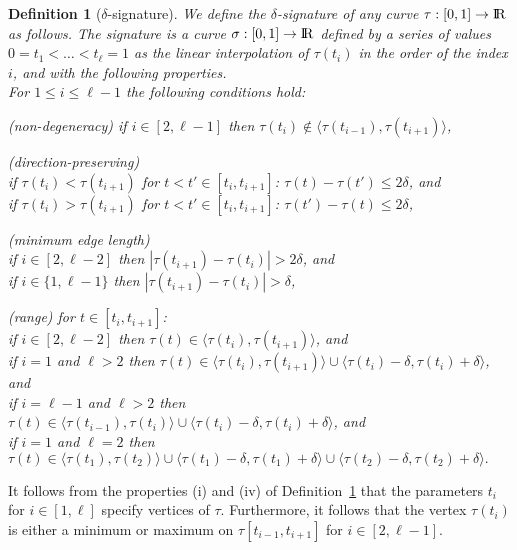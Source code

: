 \documentclass[11pt, letter]{article}
\newtheorem{definition}[theorem]{Definition}
\newcommand{\deflab}[1]{\label{def:#1}}
\newcommand{\defref}[1]{Definition~\ref{def:#1}}
\renewcommand{\Re}{{\rm I\!\hspace{-0.025em} R}}
\newcommand{\lenClusters}{\ensuremath{\ell}}
\begin{document}
\begin{definition}[$\delta$-signature]\deflab{signature}
We define the $\delta$-signature of any 
curve $\tau: [0,1]\rightarrow
\Re$ as follows.
The signature is a curve $\sigma: [0,1] \rightarrow \Re$ defined by a series of values $0=t_1 <\dots<t_\lenClusters=1$ as the linear interpolation of $\tau(t_i)$ in the order of the index $i$, and with the following properties.\\ 
For $1 \leq i \leq \lenClusters -1$ the following conditions hold: 
\begin{compactenum}[(i)]
\item (non-degeneracy) if $i \in [2,\lenClusters-1]$ then $\tau(t_i) \notin \langle \tau(t_{i-1}), \tau(t_{i+1})\rangle $,
\item (direction-preserving)\\if $\tau(t_i)<\tau(t_{i+1})$ for $t < t' \in [t_i,t_{i+1}]$:
$\tau(t)-\tau(t') \leq 2\delta$, and \\if $\tau(t_i)>\tau(t_{i+1})$ for $t < t'
\in [t_i,t_{i+1}]$: $\tau(t')-\tau(t) \leq 2\delta$,
\item (minimum edge length)\\if $i \in [2,\lenClusters-2]$ then $|\tau(t_{i+1})-\tau(t_i)| > 2\delta$, and \\if
$i\in \{1,\lenClusters-1\}$ then $|\tau(t_{i+1})-\tau(t_{i})| > \delta$,
\item (range) for $t \in [t_i,t_{i+1}]$: \\if 
$i \in [2,\lenClusters-2]$ then $\tau(t) \in \langle\tau(t_i), \tau(t_{i+1})\rangle$, and \\if 
$i=1$ and $\lenClusters>2$ then $\tau(t) \in \langle \tau(t_i),\tau(t_{i+1})\rangle \cup \langle
\tau(t_i)-\delta,\tau(t_i)+\delta\rangle$, and \\if 
$i=\lenClusters -1$  and $\lenClusters>2$ then $\tau(t) \in \langle \tau(t_{i-1}),\tau(t_i)\rangle \cup \langle
\tau(t_i)-\delta,\tau(t_i)+\delta\rangle$, and \\if
$i=1$ and $\lenClusters=2$ then $\tau(t) \in \langle \tau(t_{1}),\tau(t_2)\rangle \cup \langle
\tau(t_1)-\delta,\tau(t_1)+\delta\rangle \cup \langle
\tau(t_2)-\delta,\tau(t_2)+\delta\rangle.$
\end{compactenum}
\end{definition}

It follows from the properties (i) and (iv) of \defref{signature} that the parameters $t_i$ for $i\in [1,\ell]$ specify vertices of $\tau$. 
Furthermore, it follows that the vertex $\tau(t_i)$ is either a minimum or maximum on $\tau[t_{i-1}, t_{i+1}]$ for $i\in [2,\ell-1]$.
\end{document}
